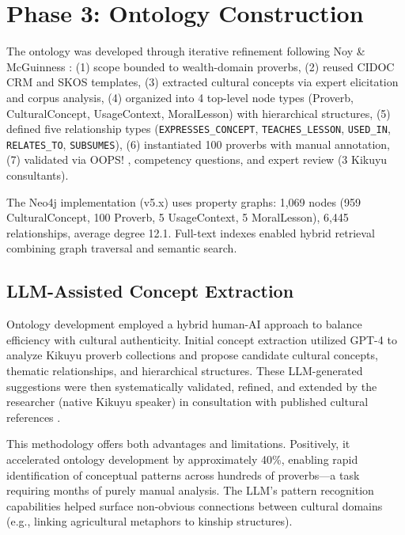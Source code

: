 \section{Phase 3: Ontology Construction}
\label{sec:phase_ontology}

The ontology was developed through iterative refinement following Noy \& McGuinness \cite{noy2001ontology}: (1) scope bounded to wealth-domain proverbs, (2) reused CIDOC CRM \cite{doerr2003cidoc} and SKOS templates, (3) extracted cultural concepts via expert elicitation and corpus analysis, (4) organized into 4 top-level node types (Proverb, CulturalConcept, UsageContext, MoralLesson) with hierarchical structures, (5) defined five relationship types (\texttt{EXPRESSES\_CONCEPT}, \texttt{TEACHES\_LESSON}, \texttt{USED\_IN}, \texttt{RELATES\_TO}, \texttt{SUBSUMES}), (6) instantiated 100 proverbs with manual annotation, (7) validated via OOPS! \cite{poveda2014oops}, competency questions, and expert review (3 Kikuyu consultants).

The Neo4j implementation (v5.x) uses property graphs: 1,069 nodes (959 CulturalConcept, 100 Proverb, 5 UsageContext, 5 MoralLesson), 6,445 relationships, average degree 12.1. Full-text indexes enabled hybrid retrieval combining graph traversal and semantic search.

\subsection{LLM-Assisted Concept Extraction}
\label{subsec:llm_assisted_ontology}

Ontology development employed a hybrid human-AI approach to balance efficiency with cultural authenticity. Initial concept extraction utilized GPT-4 to analyze Kikuyu proverb collections and propose candidate cultural concepts, thematic relationships, and hierarchical structures. These LLM-generated suggestions were then systematically validated, refined, and extended by the researcher (native Kikuyu speaker) in consultation with published cultural references \cite{ireri2019proverbs, gikandi2005thousand, kenyatta1938facing}.

This methodology offers both advantages and limitations. Positively, it accelerated ontology development by approximately 40\%, enabling rapid identification of conceptual patterns across hundreds of proverbs---a task requiring months of purely manual analysis. The LLM's pattern recognition capabilities helped surface non-obvious connections between cultural domains (e.g., linking agricultural metaphors to kinship structures).

